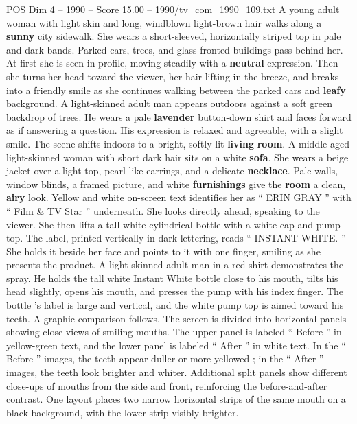 \begin{textsample}{POS Dim 4 – 1990 – Score 15.00 – 1990/tv\_com\_1990\_109.txt}  \label{ex:f4_pos_073}
A young adult woman with light skin and long, windblown light-brown hair walks along a \textbf{sunny} city sidewalk.
She wears a short-sleeved, horizontally striped top in pale and dark bands.
Parked cars, trees, and glass-fronted buildings pass behind her.
At first she is seen in profile, moving steadily with a \textbf{neutral} expression.
Then she turns her head toward the viewer, her hair lifting in the breeze, and breaks into a friendly smile as she continues walking between the parked cars and \textbf{leafy} background.
A light-skinned adult man appears outdoors against a soft green backdrop of trees.
He wears a pale \textbf{lavender} button-down shirt and faces forward as if answering a question.
His expression is relaxed and agreeable, with a slight smile.
The scene shifts indoors to a bright, softly lit \textbf{living} \textbf{room}.
A middle-aged light-skinned woman with short dark hair sits on a white \textbf{sofa}.
She wears a beige jacket over a light top, pearl-like earrings, and a delicate \textbf{necklace}.
Pale walls, window blinds, a framed picture, and white \textbf{furnishings} give the \textbf{room} a clean, \textbf{airy} look.
Yellow and white on-screen text identifies her as “ ERIN GRAY ” with “ Film \& TV Star ” underneath.
She looks directly ahead, speaking to the viewer.
She then lifts a tall white cylindrical bottle with a white cap and pump top.
The label, printed vertically in dark lettering, reads “ INSTANT WHITE. ” She holds it beside her face and points to it with one finger, smiling as she presents the product.
A light-skinned adult man in a red shirt demonstrates the spray.
He holds the tall white Instant White bottle close to his mouth, tilts his head slightly, opens his mouth, and presses the pump with his index finger.
The bottle ’s label is large and vertical, and the white pump top is aimed toward his teeth.
A graphic comparison follows.
The screen is divided into horizontal panels showing close views of smiling mouths.
The upper panel is labeled “ Before ” in yellow-green text, and the lower panel is labeled “ After ” in white text.
In the “ Before ” images, the teeth appear duller or more yellowed ; in the “ After ” images, the teeth look brighter and whiter.
Additional split panels show different close-ups of mouths from the side and front, reinforcing the before-and-after contrast.
One layout places two narrow horizontal strips of the same mouth on a black background, with the lower strip visibly brighter.

\end{textsample}
